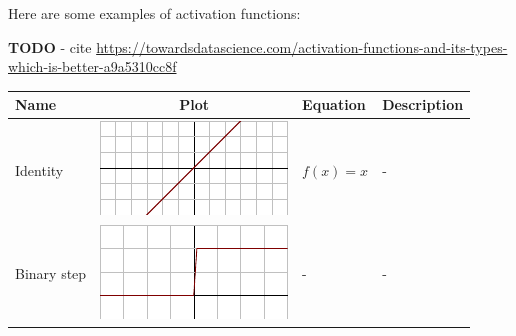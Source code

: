 Here are some examples of activation functions:

\textbf{TODO} - cite \url{https://towardsdatascience.com/activation-functions-and-its-types-which-is-better-a9a5310cc8f}

\begin{tabular}{| p{25mm} | c | l | l |}

\hline

Name & Plot & Equation & Description \\

\hline

Identity & \begin{minipage}{.2\textwidth}
      \includegraphics[width=\textwidth]{tex/images/activation/identity}
    \end{minipage} & $f(x) = x$ & - \\
      
Binary step & \begin{minipage}{.2\textwidth}
      \includegraphics[width=\textwidth]{tex/images/activation/binstep}
    \end{minipage} & - & -  \\
    

\end{tabular}
